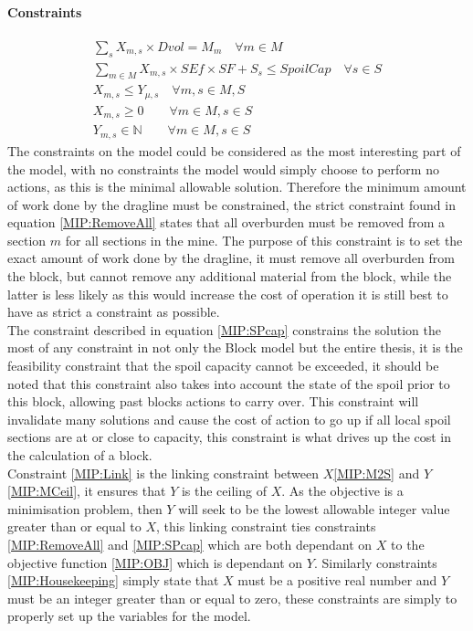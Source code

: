 \paragraph*{Constraints}
\begin{align}
\label{MIP:RemoveAll}
\sum_{s}X_{m,s}\times Dvol = M_{m}  \quad \forall m\in M  \\
\label{MIP:SPcap}
\sum_{m\in M} X_{m,s}\times SEf \times SF + S_s\leq SpoilCap \quad \forall s \in S \\ 
\label{MIP:Link}
X_{m,s} \leq Y_{\mu,s} \quad \forall m,s \in M,S\\
\label{MIP:Housekeeping}
X_{m,s} \geq 0 \qquad \forall m \in M , s \in S\\
Y_{m,s} \in \mathbb{N} \qquad \forall m \in M , s \in S
\end{align}
The constraints on the model could be considered as the most interesting part of the model, with no constraints the model would simply choose to perform no actions, as this is the minimal allowable solution. Therefore the minimum amount of work done by the dragline must be constrained, the strict constraint found in  equation \ref{MIP:RemoveAll} states that all overburden must be removed from a section $m$ for all sections in the mine. The purpose of this constraint is to set the exact amount of work done by the dragline, it must remove all overburden from the block, but cannot remove any additional material from the block, while the latter is less likely as this would increase the cost of operation it is still best to have as strict a constraint as possible. \\
The constraint described in equation \ref{MIP:SPcap} constrains the solution the most of any constraint in not only the Block model but the entire thesis, it is the feasibility constraint that the spoil capacity cannot be exceeded, it should be noted that this constraint also takes into account the state of the spoil prior to this block, allowing past blocks actions to carry over. This constraint will invalidate many solutions and cause the cost of action to go up if all local spoil sections are at or close to capacity, this constraint is what drives up the cost in the calculation of a block. 
\\ Constraint \ref{MIP:Link} is the linking constraint between $X$\ref{MIP:M2S} and $Y$\ref{MIP:MCeil}, it ensures that $Y$ is the ceiling of $X$. As the objective is a minimisation problem, then $Y$ will seek to be the lowest allowable integer value greater than or equal to $X$, this linking constraint ties constraints \ref{MIP:RemoveAll} and \ref{MIP:SPcap} which are both dependant on $X$ to the objective function \ref{MIP:OBJ} which is dependant on $Y$. Similarly constraints \ref{MIP:Housekeeping} simply state that $X$ must be a positive real number and $Y$ must be an integer greater than or equal to zero, these constraints are simply to properly set up the variables for the model. 
